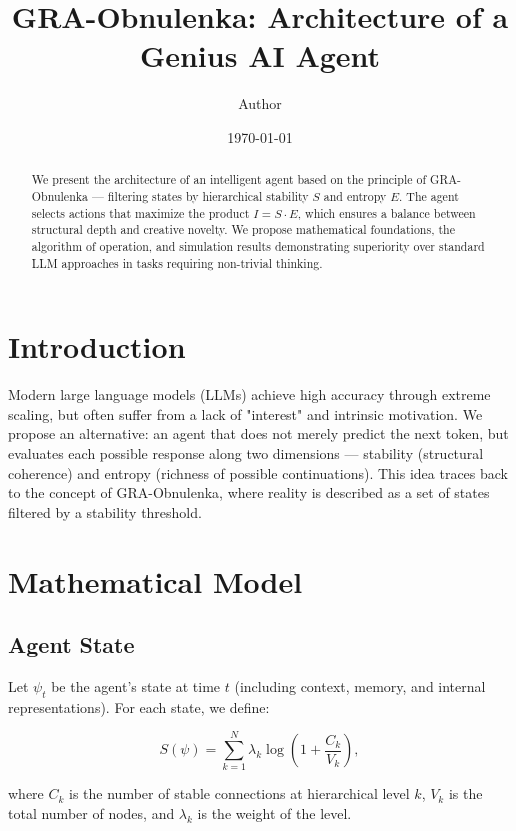\documentclass[12pt,a4paper]{article}
\title{GRA-Obnulenka: Architecture of a Genius AI Agent}
\author{Author}
\date{\today}
\begin{document}
\maketitle

\begin{abstract}
We present the architecture of an intelligent agent based on the principle of GRA-Obnulenka — filtering states by hierarchical stability $S$ and entropy $E$. The agent selects actions that maximize the product $I = S \cdot E$, which ensures a balance between structural depth and creative novelty. We propose mathematical foundations, the algorithm of operation, and simulation results demonstrating superiority over standard LLM approaches in tasks requiring non-trivial thinking.
\end{abstract}

\section{Introduction}

Modern large language models (LLMs) achieve high accuracy through extreme scaling, but often suffer from a lack of "interest" and intrinsic motivation. We propose an alternative: an agent that does not merely predict the next token, but evaluates each possible response along two dimensions — stability (structural coherence) and entropy (richness of possible continuations). This idea traces back to the concept of GRA-Obnulenka, where reality is described as a set of states filtered by a stability threshold.

\section{Mathematical Model}

\subsection{Agent State}

Let $\psi_t$ be the agent's state at time $t$ (including context, memory, and internal representations). For each state, we define:

\begin{equation}
S(\psi) = \sum_{k=1}^{N} \lambda_k \log\!\left(1 + \frac{C_k}{V_k}\right),
\end{equation}

where $C_k$ is the number of stable connections at hierarchical level $k$, $V_k$ is the total number of nodes, and $\lambda_k$ is the weight of the level.
\end{document}
